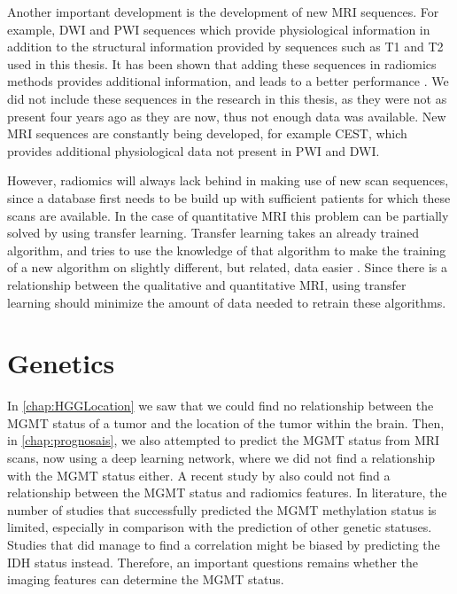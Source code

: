 Another important development is the development of new \gls{MRI} sequences.
For example, \gls{DWI} and \gls{PWI} sequences which provide physiological information in addition to the structural information provided by sequences such as \gls{T1} and \gls{T2} used in this thesis.
It has been shown that adding these sequences in radiomics methods provides additional information, and leads to a better performance \autocite{park2020radiomicsdwi,kim2020radiomicsdwi}.
We did not include these sequences in the research in this thesis, as they were not as present four years ago as they are now, thus not enough data was available.
New \gls{MRI} sequences are constantly being developed, for example \gls{CEST}, which provides additional physiological data not present in \gls{PWI} and \gls{DWI}.

However, radiomics will always lack behind in making use of new scan sequences, since a database first needs to be build up with sufficient patients for which these scans are available.
In the case of quantitative \gls{MRI} this problem can be partially solved by using transfer learning.
Transfer learning takes an already trained algorithm, and tries to use the knowledge of that algorithm to make the training of a new algorithm on slightly different, but related, data easier \autocite{shin2016transfer}.
Since there is a relationship between the qualitative and quantitative \gls{MRI}, using transfer learning should minimize the amount of data needed to retrain these algorithms.


\section{Genetics}

In \cref{chap:HGGLocation} we saw that we could find no relationship between the \gls{MGMT} status of a tumor and the location of the tumor within the brain.
Then, in \cref{chap:prognosais}, we also attempted to predict the \gls{MGMT} status from \gls{MRI} scans, now using a deep learning network, where we did not find a relationship with the \gls{MGMT} status either.
A recent study by  also could not find a relationship between the \gls{MGMT} status and radiomics features.
In literature, the number of studies that successfully predicted the MGMT methylation status is limited, especially in comparison with the prediction of other genetic statuses.
Studies that did manage to find a correlation might be biased by predicting the IDH status instead.
Therefore, an important questions remains whether the imaging features can determine the MGMT status.

